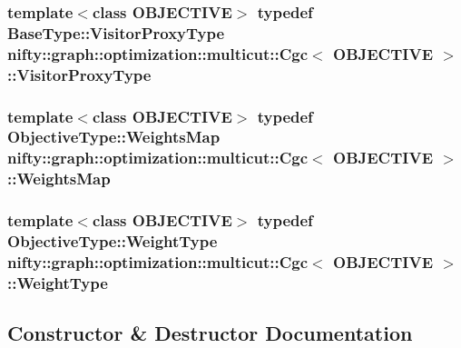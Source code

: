 \subsubsection[{Visitor\+Proxy\+Type}]{\setlength{\rightskip}{0pt plus 5cm}template$<$class O\+B\+J\+E\+C\+T\+I\+V\+E$>$ typedef {\bf Base\+Type\+::\+Visitor\+Proxy\+Type} {\bf nifty\+::graph\+::optimization\+::multicut\+::\+Cgc}$<$ O\+B\+J\+E\+C\+T\+I\+V\+E $>$\+::{\bf Visitor\+Proxy\+Type}}\label{classnifty_1_1graph_1_1optimization_1_1multicut_1_1Cgc_a0c82617574e6f1c5b2e801ed5699d725}
\hypertarget{classnifty_1_1graph_1_1optimization_1_1multicut_1_1Cgc_a6d3ba8605fd7c111fca7a9f79ca09c32}{}
\subsubsection[{Weights\+Map}]{\setlength{\rightskip}{0pt plus 5cm}template$<$class O\+B\+J\+E\+C\+T\+I\+V\+E$>$ typedef Objective\+Type\+::\+Weights\+Map {\bf nifty\+::graph\+::optimization\+::multicut\+::\+Cgc}$<$ O\+B\+J\+E\+C\+T\+I\+V\+E $>$\+::{\bf Weights\+Map}}\label{classnifty_1_1graph_1_1optimization_1_1multicut_1_1Cgc_a6d3ba8605fd7c111fca7a9f79ca09c32}
\hypertarget{classnifty_1_1graph_1_1optimization_1_1multicut_1_1Cgc_ac8f7c1da4b33561e45fe423f2c12b2b5}{}
\subsubsection[{Weight\+Type}]{\setlength{\rightskip}{0pt plus 5cm}template$<$class O\+B\+J\+E\+C\+T\+I\+V\+E$>$ typedef Objective\+Type\+::\+Weight\+Type {\bf nifty\+::graph\+::optimization\+::multicut\+::\+Cgc}$<$ O\+B\+J\+E\+C\+T\+I\+V\+E $>$\+::{\bf Weight\+Type}}\label{classnifty_1_1graph_1_1optimization_1_1multicut_1_1Cgc_ac8f7c1da4b33561e45fe423f2c12b2b5}


\subsection{Constructor \& Destructor Documentation}
\hypertarget{classnifty_1_1graph_1_1optimization_1_1multicut_1_1Cgc_a22509c2e989ab4f224a4caacfb54d6da}{}
